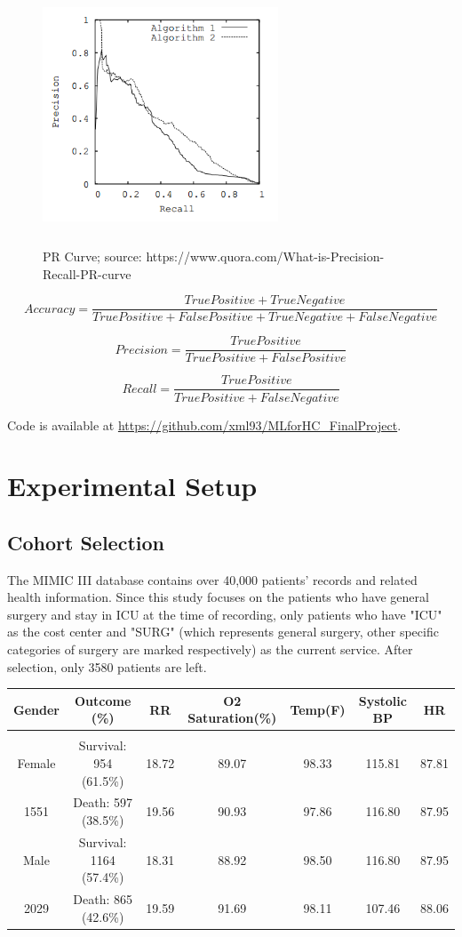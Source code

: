 \documentclass[twoside,11pt]{article}
\begin{document}
\begin{figure}[htbp]
  \centering 
  \caption{PR Curve; source: https://www.quora.com/What-is-Precision-Recall-PR-curve}
  \includegraphics[height=7cm, width=7cm]{fig3} 
  \label{fig3} 
\end{figure} 

\[Accuracy = \frac{True Positive + True Negative}{True Positive + False Positive + True Negative +False Negative}\]

\[Precision = \frac{True Positive}{True Positive + False Positive}\]

\[Recall = \frac{True Positive}{True Positive + False Negative}\]

Code is available at \url{https://github.com/xml93/MLforHC_FinalProject}.

\section{Experimental Setup} \label{experiment}

\subsection{Cohort Selection} 
The MIMIC III database contains over 40,000 patients' records and related health information. Since this study focuses on the patients who have general surgery and stay in ICU at the time of recording, only patients who have "ICU" as the cost center and "SURG" (which represents general surgery, other specific categories of surgery are marked respectively) as the current service. After selection, only 3580 patients are left. 

\begin{table}[htbp]
  \centering 
  \begin{tabular}{|c|c|c|c|c|c|c|} 
    Gender & Outcome (\%) & RR & O2 Saturation(\%) & Temp(F) & Systolic BP & HR\\ 
    \hline \\[-11pt]
    Female & Survival: 954 (61.5\%) & 18.72 & 89.07 & 98.33 & 115.81 & 87.81\\ 
    1551 & Death: 597 (38.5\%) & 19.56 & 90.93 & 97.86 & 116.80 & 87.95\\ 
    Male & Survival: 1164 (57.4\%) & 18.31 & 88.92 & 98.50 & 116.80 & 87.95\\
    2029 & Death: 865 (42.6\%) & 19.59 & 91.69 & 98.11 & 107.46 & 88.06\\ \hline 
  \end{tabular}
\end{table}
\end{document}
